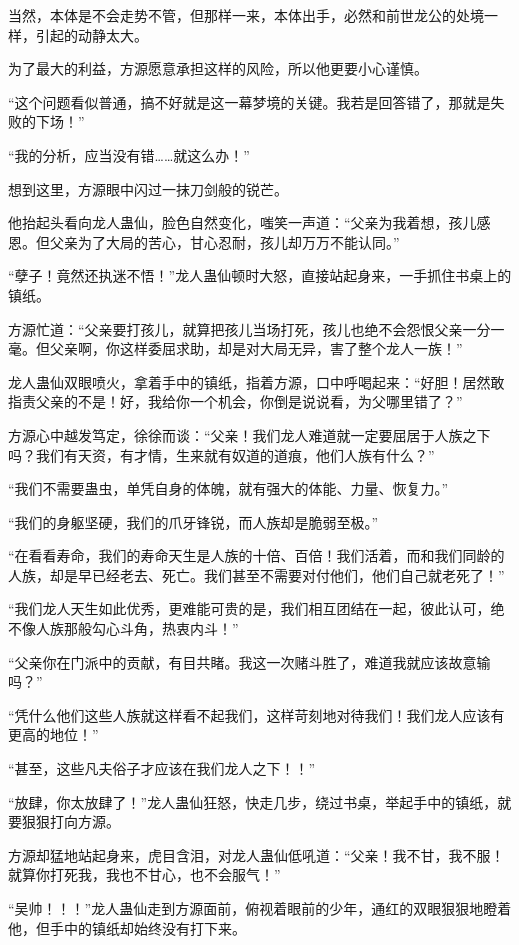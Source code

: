 \begin{this_body}
当然，本体是不会走势不管，但那样一来，本体出手，必然和前世龙公的处境一样，引起的动静太大。

为了最大的利益，方源愿意承担这样的风险，所以他更要小心谨慎。

“这个问题看似普通，搞不好就是这一幕梦境的关键。我若是回答错了，那就是失败的下场！”

“我的分析，应当没有错……就这么办！”

想到这里，方源眼中闪过一抹刀剑般的锐芒。

他抬起头看向龙人蛊仙，脸色自然变化，嗤笑一声道：“父亲为我着想，孩儿感恩。但父亲为了大局的苦心，甘心忍耐，孩儿却万万不能认同。”

“孽子！竟然还执迷不悟！”龙人蛊仙顿时大怒，直接站起身来，一手抓住书桌上的镇纸。

方源忙道：“父亲要打孩儿，就算把孩儿当场打死，孩儿也绝不会怨恨父亲一分一毫。但父亲啊，你这样委屈求助，却是对大局无异，害了整个龙人一族！”

龙人蛊仙双眼喷火，拿着手中的镇纸，指着方源，口中呼喝起来：“好胆！居然敢指责父亲的不是！好，我给你一个机会，你倒是说说看，为父哪里错了？”

方源心中越发笃定，徐徐而谈：“父亲！我们龙人难道就一定要屈居于人族之下吗？我们有天资，有才情，生来就有奴道的道痕，他们人族有什么？”

“我们不需要蛊虫，单凭自身的体魄，就有强大的体能、力量、恢复力。”

“我们的身躯坚硬，我们的爪牙锋锐，而人族却是脆弱至极。”

“在看看寿命，我们的寿命天生是人族的十倍、百倍！我们活着，而和我们同龄的人族，却是早已经老去、死亡。我们甚至不需要对付他们，他们自己就老死了！”

“我们龙人天生如此优秀，更难能可贵的是，我们相互团结在一起，彼此认可，绝不像人族那般勾心斗角，热衷内斗！”

“父亲你在门派中的贡献，有目共睹。我这一次赌斗胜了，难道我就应该故意输吗？”

“凭什么他们这些人族就这样看不起我们，这样苛刻地对待我们！我们龙人应该有更高的地位！”

“甚至，这些凡夫俗子才应该在我们龙人之下！！”

“放肆，你太放肆了！”龙人蛊仙狂怒，快走几步，绕过书桌，举起手中的镇纸，就要狠狠打向方源。

方源却猛地站起身来，虎目含泪，对龙人蛊仙低吼道：“父亲！我不甘，我不服！就算你打死我，我也不甘心，也不会服气！”

“吴帅！！！”龙人蛊仙走到方源面前，俯视着眼前的少年，通红的双眼狠狠地瞪着他，但手中的镇纸却始终没有打下来。


\end{this_body}
